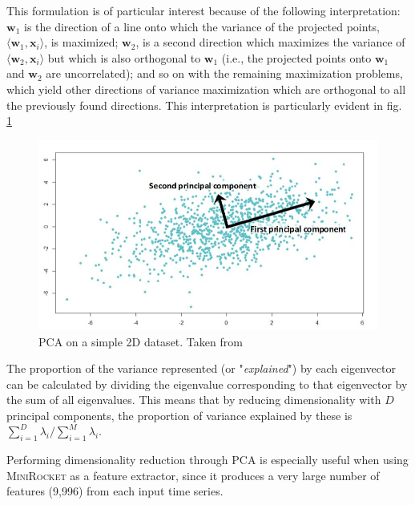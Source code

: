 This formulation is of particular interest because of the following interpretation: $\mathbf{w}_1$ is the direction of a line onto which the variance of the projected points, $\langle\mathbf{w}_1,\mathbf{x}_i\rangle$, is maximized; $\mathbf{w}_2$, is a second direction which maximizes the variance of $\langle\mathbf{w}_2,\mathbf{x}_i\rangle$ but which is also orthogonal to $\mathbf{w}_1$ (i.e., the projected points onto $\mathbf{w}_1$ and $\mathbf{w}_2$ are uncorrelated); and so on with the remaining maximization problems, which yield other directions of variance maximization which are orthogonal to all the previously found directions. This interpretation is particularly evident in fig. \ref{fig:pca}

\begin{figure}[htb!]
    \centering
    \includegraphics[width=\textwidth]{images/pca}
    \caption[PCA on a 2D dataset]{PCA on a simple 2D dataset. Taken from \cite{pca_img}}
    \label{fig:pca}
\end{figure}

The proportion of the variance represented (or "\textit{explained}") by each eigenvector can be calculated by dividing the eigenvalue corresponding to that eigenvector by the sum of all eigenvalues. This means that by reducing dimensionality with $D$ principal components, the proportion of variance explained by these is $\sum_{i=1}^D \lambda_i / \sum_{i=1}^M \lambda_i$.

Performing dimensionality reduction through PCA is especially useful when using \textsc{MiniRocket} as a feature extractor, since it produces a very large number of features (9,996) from each input time series.





